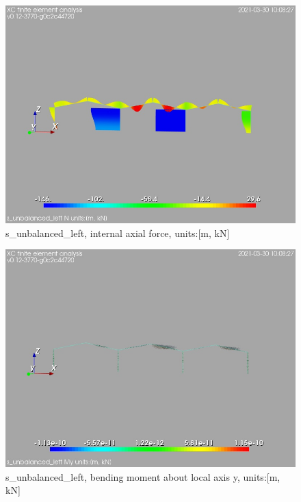 \begin{figure}
\begin{center}
\includegraphics[width=\linewidth]{calc_results/sole_zeinali/text/graphics/resSimplLC/s_unbalanced_leftallMemberSetN}
\caption{s_unbalanced_left, internal axial force, units:[m, kN]}
\end{center}
\end{figure}
\begin{figure}
\begin{center}
\includegraphics[width=\linewidth]{calc_results/sole_zeinali/text/graphics/resSimplLC/s_unbalanced_leftallMemberSetMy}
\caption{s_unbalanced_left, bending moment about local axis y, units:[m, kN]}
\end{center}
\end{figure}
